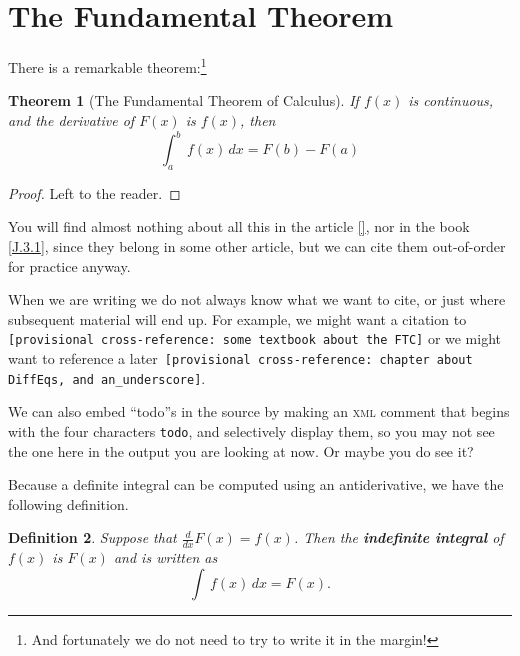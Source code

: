 \documentclass[pdflatex]{sn-jnl}
\theoremstyle{thmstyleone}%
\newtheorem{theorem}{Theorem}[section]
\theoremstyle{thmstyletwo}%
\newtheorem{definition}[theorem]{Definition}
\theoremstyle{thmstylethree}%
\newcommand{\xreffont}{\relax}
\newcommand{\mono}[1]{\texttt{#1}}
\newcommand{\initialism}[1]{\textsc{\MakeLowercase{#1}}}
\newcommand{\terminology}[1]{\textbf{#1}}
\numberwithin{equation}{section}
\newcommand{\definiteintegral}[4]{\int_{#1}^{#2}\,#3\,d#4}
\begin{document}
\section{The Fundamental Theorem}\label{section-fundamental-theorem}%
There is a remarkable theorem:\footnote{And fortunately we do not need to try to write it in the margin!\label{footnote-fermat}}%
\begin{theorem}[The Fundamental Theorem of Calculus]\label{theorem-FTC}%
%
%
If \(f(x)\) is continuous, and the derivative of \(F(x)\) is \(f(x)\), then%
\begin{equation*}
\definiteintegral{a}{b}{f(x)}{x}=F(b)-F(a)
\end{equation*}
%
\end{theorem}
\begin{proof}\label{theorem-FTC-4}%
Left to the reader.%
\end{proof}
You will find almost nothing about all this in the article \hyperlink{biblio-lay-article}{[{\xreffont 2}]}, nor in the book \hyperlink{biblio-judson-AATA}{[{\xreffont J.3.1}]}, since they belong in some other article, but we can cite them out-of-order for practice anyway.%
\par
When we are writing we do not always know what we want to cite, or just where subsequent material will end up.  For example, we might want a citation to \mono{[provisional cross-reference: some textbook about the FTC]} or we might want to reference a later~\mono{[provisional cross-reference: chapter about DiffEq\textquotesingle{}s, and an\_underscore]}.%
\par
We can also embed ``todo''s in the source by making an \initialism{XML} comment that begins with the four characters \mono{todo}, and selectively display them, so you may not see the one here in the output you are looking at now.  Or maybe you do see it?%
\par
Because a definite integral can be computed using an antiderivative, we have the following definition.%
\begin{definition}\label{definition-indefinite-integral}%
%
%
%
\label{definition-indefinite-integral-3}%
Suppose that \(\frac{d}{dx}F(x)=f(x)\).  Then the \terminology{indefinite integral} of \(f(x)\) is \(F(x)\) and is written as%
\begin{equation*}
\int\,f(x)\,dx=F(x)\text{.}
\end{equation*}
%
\end{definition}
%
%
\typeout{************************************************}
\typeout{************************************************}
%
\end{document}
